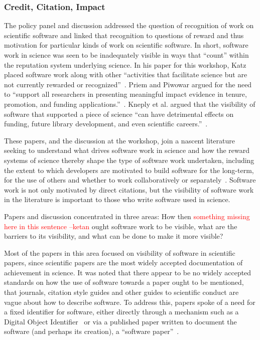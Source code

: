 \documentclass[11pt, oneside]{amsart}
\newcommand{\note}[1]{ {\textcolor{red}    { #1 }}}
\begin{document}
\subsubsection*{Credit, Citation, Impact}

The policy panel and discussion addressed the question of recognition of work on scientific software and linked that recognition to questions of reward and thus motivation for particular kinds of work on scientific software. In short, software work in science was seen to be inadequately visible in ways that ``count'' within the reputation system underlying science. In his paper for this workshop, Katz placed software work along with other ``activities that facilitate science but are not currently rewarded or recognized''~\cite{Katz_WSSSPE}. Priem and Piwowar argued for the need to ``support all researchers in presenting meaningful impact evidence in tenure, promotion, and funding applications.''~\cite{Priem_WSSSPE}.  Kneply et al. argued that the visibility of software that supported a piece of science ``can have detrimental effects on funding, future library development, and even scientific careers.''~\cite{Knepley_WSSSPE}.

These papers, and the discussion at the workshop, join a nascent literature seeking to understand what drives software work in science and how the reward systems of science thereby shape the type of software work undertaken, including the extent to which developers are motivated to build software for the long-term, for the use of others and whether to work collaboratively or separately~\cite{howison_incentives_2013, howison_scientific_2011, bietz_synergizing_2010}. Software work is not only motivated by direct citations, but the visibility of software work in the literature is important to those who write software used in science.

Papers and discussion concentrated in three areas: How then \note{something missing here in this sentence --ketan} ought software  work to be visible, what are the barriers to its visibility, and what can be done to make it more visible?

Most of the papers in this area focused on visibility of software in scientific papers, since scientific papers are the most widely accepted documentation of achievement in science. It was noted that there appear to be no widely accepted standards on how the use of software towards a paper ought to be mentioned, that journals, citation style guides and other guides to scientific conduct are vague about how to describe software. To address this, papers spoke of a need for a fixed identifier for software, either directly through a mechanism such as a Digital Object Identifier~\cite{Katz_WSSSPE,Knepley_WSSSPE} or via a published paper written to document the software (and perhaps its creation), a ``software paper''~\cite{Chue_Hong_WSSSPE}.
\end{document}
